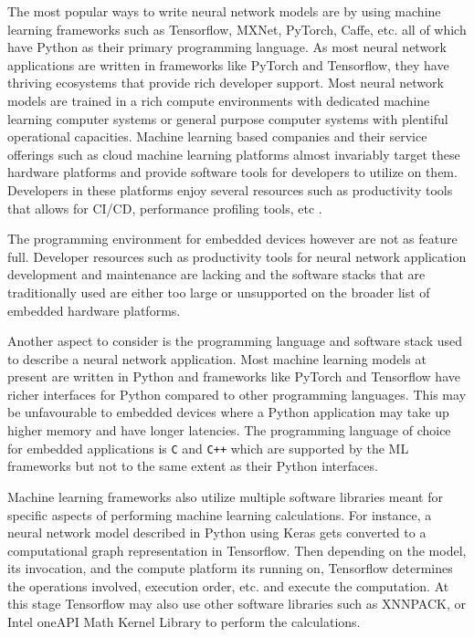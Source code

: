 The most popular ways to write neural network models are by using machine learning frameworks such as Tensorflow, MXNet, PyTorch, Caffe, etc. all of which have Python as their primary programming language. As most neural network applications are written in frameworks like PyTorch and Tensorflow, they have thriving ecosystems that provide rich developer support. Most neural network models are trained in a rich compute environments with dedicated machine learning computer systems or general purpose computer systems with plentiful operational capacities. Machine learning based companies and their service offerings such as cloud machine learning platforms almost invariably target these hardware platforms and provide software tools for developers to utilize on them. Developers in these platforms enjoy several resources such as productivity tools that allows for CI/CD, performance profiling tools, etc \cite{Saucedo_Awesome_Production_Machine}.

The programming environment for embedded devices however are not as feature full. Developer resources such as productivity tools for neural network application development and maintenance are lacking and the software stacks that are traditionally used are either too large or unsupported on the broader list of embedded hardware platforms.

Another aspect to consider is the programming language and software stack used to describe a neural network application. Most machine learning models at present are written in Python and frameworks like PyTorch and Tensorflow have richer interfaces for Python compared to other programming languages. This may be unfavourable to embedded devices where a Python application may take up higher memory and have longer latencies. The programming language of choice for embedded applications is \texttt{C} and \texttt{C++} which are supported by the ML frameworks but not to the same extent as their Python interfaces.

Machine learning frameworks also utilize multiple software libraries meant for specific aspects of performing machine learning calculations. For instance, a neural network model described in Python using Keras gets converted to a computational graph representation in Tensorflow. Then depending on the model, its invocation, and the compute platform its running on, Tensorflow determines the operations involved, execution order, etc. and execute the computation. At this stage Tensorflow may also use other software libraries such as XNNPACK, or Intel oneAPI Math Kernel Library to perform the calculations.

